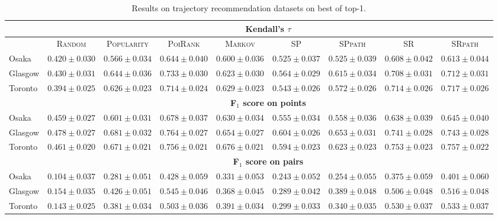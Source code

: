 \begin{table*}[!h]
\centering
\scriptsize
\setlength{\tabcolsep}{3pt} %
\begin{tabular}{l|cc|ccc|ccc} \hline
& \multicolumn{8}{c}{\bf Kendall's $\tau$} \\ \hline
 & \textsc{Random} & \textsc{Popularity} & \textsc{PoiRank} & \textsc{Markov} & \textsc{SP} & \textsc{SPpath} & \textsc{SR} & \textsc{SRpath} \\ \hline
Osaka & $0.420\pm0.030$ & $0.566\pm0.034$ & $\mathbf{0.644\pm0.040}$ & $0.600\pm0.036$ & $0.525\pm0.037$ & $0.525\pm0.039$ & $0.608\pm0.042$ & $\mathit{0.613\pm0.044}$ \\
Glasgow & $0.430\pm0.031$ & $0.644\pm0.036$ & $\mathbf{0.733\pm0.030}$ & $0.623\pm0.030$ & $0.564\pm0.029$ & $0.615\pm0.034$ & $0.708\pm0.031$ & $\mathit{0.712\pm0.031}$ \\
Toronto & $0.394\pm0.025$ & $0.626\pm0.023$ & $\mathit{0.714\pm0.024}$ & $0.629\pm0.023$ & $0.543\pm0.026$ & $0.572\pm0.026$ & $0.714\pm0.026$ & $\mathbf{0.717\pm0.026}$ \\
\hline
& \multicolumn{8}{c}{\bf F$_1$ score on points} \\ \hline
Osaka & $0.459\pm0.027$ & $0.601\pm0.031$ & $\mathbf{0.678\pm0.037}$ & $0.630\pm0.034$ & $0.555\pm0.034$ & $0.558\pm0.036$ & $0.638\pm0.039$ & $\mathit{0.645\pm0.040}$ \\
Glasgow & $0.478\pm0.027$ & $0.681\pm0.032$ & $\mathbf{0.764\pm0.027}$ & $0.654\pm0.027$ & $0.604\pm0.026$ & $0.653\pm0.031$ & $0.741\pm0.028$ & $\mathit{0.743\pm0.028}$ \\
Toronto & $0.461\pm0.020$ & $0.671\pm0.021$ & $\mathit{0.756\pm0.021}$ & $0.676\pm0.021$ & $0.594\pm0.023$ & $0.623\pm0.023$ & $0.753\pm0.023$ & $\mathbf{0.757\pm0.022}$ \\
\hline
& \multicolumn{8}{c}{\bf F$_1$ score on pairs} \\ \hline
Osaka & $0.104\pm0.037$ & $0.281\pm0.051$ & $\mathbf{0.428\pm0.059}$ & $0.331\pm0.053$ & $0.243\pm0.052$ & $0.254\pm0.055$ & $0.375\pm0.059$ & $\mathit{0.401\pm0.060}$ \\
Glasgow & $0.154\pm0.035$ & $0.426\pm0.051$ & $\mathbf{0.545\pm0.046}$ & $0.368\pm0.045$ & $0.289\pm0.042$ & $0.389\pm0.048$ & $0.506\pm0.048$ & $\mathit{0.516\pm0.048}$ \\
Toronto & $0.143\pm0.025$ & $0.381\pm0.034$ & $0.503\pm0.036$ & $0.391\pm0.034$ & $0.299\pm0.033$ & $0.340\pm0.035$ & $\mathit{0.530\pm0.037}$ & $\mathbf{0.533\pm0.037}$ \\
\hline
\end{tabular}
\caption{Results on trajectory recommendation datasets on best of top-1.}
\end{table*}


